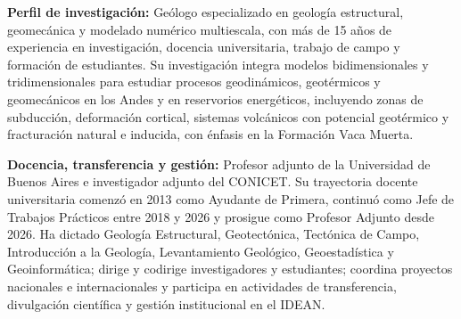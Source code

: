 
\begin{cvparagraph}

\textbf{Perfil de investigación:} Geólogo especializado en geología estructural, geomecánica y modelado numérico multiescala, con más de 15 años de experiencia en investigación, docencia universitaria, trabajo de campo y formación de estudiantes. Su investigación integra modelos bidimensionales y tridimensionales para estudiar procesos geodinámicos, geotérmicos y geomecánicos en los Andes y en reservorios energéticos, incluyendo zonas de subducción, deformación cortical, sistemas volcánicos con potencial geotérmico y fracturación natural e inducida, con énfasis en la Formación Vaca Muerta.

\textbf{Docencia, transferencia y gestión:} Profesor adjunto de la Universidad de Buenos Aires e investigador adjunto del CONICET. Su trayectoria docente universitaria comenzó en 2013 como Ayudante de Primera, continuó como Jefe de Trabajos Prácticos entre 2018 y 2026 y prosigue como Profesor Adjunto desde 2026. Ha dictado Geología Estructural, Geotectónica, Tectónica de Campo, Introducción a la Geología, Levantamiento Geológico, Geoestadística y Geoinformática; dirige y codirige investigadores y estudiantes; coordina proyectos nacionales e internacionales y participa en actividades de transferencia, divulgación científica y gestión institucional en el IDEAN.

\end{cvparagraph}

